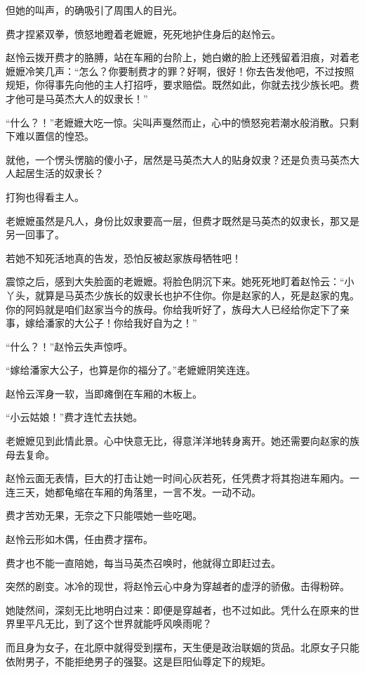 \begin{this_body}
但她的叫声，的确吸引了周围人的目光。

费才捏紧双拳，愤怒地瞪着老嬷嬷，死死地护住身后的赵怜云。

赵怜云拨开费才的胳膊，站在车厢的台阶上，她白嫩的脸上还残留着泪痕，对着老嬷嬷冷笑几声：“怎么？你要制费才的罪？好啊，很好！你去告发他吧，不过按照规矩，你得事先向他的主人打招呼，要求赔偿。既然如此，你就去找少族长吧。费才他可是马英杰大人的奴隶长！”

“什么？！”老嬷嬷大吃一惊。尖叫声戛然而止，心中的愤怒宛若潮水般消散。只剩下难以置信的惶恐。

就他，一个愣头愣脑的傻小子，居然是马英杰大人的贴身奴隶？还是负责马英杰大人起居生活的奴隶长？

打狗也得看主人。

老嬷嬷虽然是凡人，身份比奴隶要高一层，但费才既然是马英杰的奴隶长，那又是另一回事了。

若她不知死活地真的告发，恐怕反被赵家族母牺牲吧！

震惊之后，感到大失脸面的老嬷嬷。将脸色阴沉下来。她死死地盯着赵怜云：“小丫头，就算是马英杰少族长的奴隶长也护不住你。你是赵家的人，死是赵家的鬼。你的阿妈就是咱们赵家当今的族母。你给我听好了，族母大人已经给你定下了亲事，嫁给潘家的大公子！你给我好自为之！”

“什么？！”赵怜云失声惊呼。

“嫁给潘家大公子，也算是你的福分了。”老嬷嬷阴笑连连。

赵怜云浑身一软，当即瘫倒在车厢的木板上。

“小云姑娘！”费才连忙去扶她。

老嬷嬷见到此情此景。心中快意无比，得意洋洋地转身离开。她还需要向赵家的族母去复命。

赵怜云面无表情，巨大的打击让她一时间心灰若死，任凭费才将其抱进车厢内。一连三天，她都龟缩在车厢的角落里，一言不发。一动不动。

费才苦劝无果，无奈之下只能喂她一些吃喝。

赵怜云形如木偶，任由费才摆布。

费才也不能一直陪她，每当马英杰召唤时，他就得立即赶过去。

突然的剧变。冰冷的现世，将赵怜云心中身为穿越者的虚浮的骄傲。击得粉碎。

她陡然间，深刻无比地明白过来：即便是穿越者，也不过如此。凭什么在原来的世界里平凡无比，到了这个世界就能呼风唤雨呢？

而且身为女子，在北原中就得受到摆布，天生便是政治联姻的货品。北原女子只能依附男子，不能拒绝男子的强娶。这是巨阳仙尊定下的规矩。


\end{this_body}

